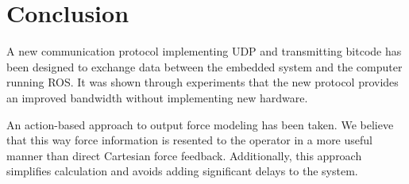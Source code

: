 \section{Conclusion}
A new communication protocol implementing UDP and transmitting bitcode has been designed to exchange data between the embedded system and the computer running ROS. It was shown through experiments that the new protocol provides an improved bandwidth without implementing new hardware. 

An action-based approach to output force modeling has been taken. 
We believe that this way force information is resented to the operator in a more useful manner than direct Cartesian force feedback.
Additionally, this approach simplifies calculation and avoids adding significant delays to the system.